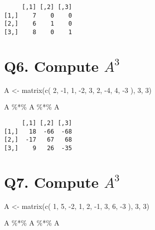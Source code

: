 \documentclass[
  letterpaper,
  DIV=11,
  numbers=noendperiod]{scrartcl}
\newenvironment{Shaded}{\begin{snugshade}}{\end{snugshade}}
\newcommand{\DecValTok}[1]{\textcolor[rgb]{0.68,0.00,0.00}{#1}}
\newcommand{\FunctionTok}[1]{\textcolor[rgb]{0.28,0.35,0.67}{#1}}
\newcommand{\NormalTok}[1]{\textcolor[rgb]{0.00,0.23,0.31}{#1}}
\newcommand{\OtherTok}[1]{\textcolor[rgb]{0.00,0.23,0.31}{#1}}
\newcommand{\SpecialCharTok}[1]{\textcolor[rgb]{0.37,0.37,0.37}{#1}}
\begin{document}
\begin{verbatim}
     [,1] [,2] [,3]
[1,]    7    0    0
[2,]    6    1    0
[3,]    8    0    1
\end{verbatim}

\hypertarget{q6.-compute-a3}{%
\section{\texorpdfstring{Q6. Compute
\(A^3\)}{Q6. Compute A\^{}3}}\label{q6.-compute-a3}}

\begin{Shaded}
\begin{Highlighting}[]
\NormalTok{A }\OtherTok{\textless{}{-}} \FunctionTok{matrix}\NormalTok{(}\FunctionTok{c}\NormalTok{(}
  \DecValTok{2}\NormalTok{, }\SpecialCharTok{{-}}\DecValTok{1}\NormalTok{, }\DecValTok{1}\NormalTok{,}
  \SpecialCharTok{{-}}\DecValTok{2}\NormalTok{, }\DecValTok{3}\NormalTok{, }\DecValTok{2}\NormalTok{,}
  \SpecialCharTok{{-}}\DecValTok{4}\NormalTok{, }\DecValTok{4}\NormalTok{, }\SpecialCharTok{{-}}\DecValTok{3}
\NormalTok{), }\DecValTok{3}\NormalTok{, }\DecValTok{3}\NormalTok{)}

\NormalTok{A }\SpecialCharTok{\%*\%}\NormalTok{ A }\SpecialCharTok{\%*\%}\NormalTok{ A}
\end{Highlighting}
\end{Shaded}

\begin{verbatim}
     [,1] [,2] [,3]
[1,]   18  -66  -68
[2,]  -17   67   68
[3,]    9   26  -35
\end{verbatim}

\hypertarget{q7.-compute-a3}{%
\section{\texorpdfstring{Q7. Compute
\(A^3\)}{Q7. Compute A\^{}3}}\label{q7.-compute-a3}}

\begin{Shaded}
\begin{Highlighting}[]
\NormalTok{A }\OtherTok{\textless{}{-}} \FunctionTok{matrix}\NormalTok{(}\FunctionTok{c}\NormalTok{(}
  \DecValTok{1}\NormalTok{, }\DecValTok{5}\NormalTok{, }\SpecialCharTok{{-}}\DecValTok{2}\NormalTok{,}
  \DecValTok{1}\NormalTok{, }\DecValTok{2}\NormalTok{, }\SpecialCharTok{{-}}\DecValTok{1}\NormalTok{,}
  \DecValTok{3}\NormalTok{, }\DecValTok{6}\NormalTok{, }\SpecialCharTok{{-}}\DecValTok{3}
\NormalTok{), }\DecValTok{3}\NormalTok{, }\DecValTok{3}\NormalTok{)}

\NormalTok{A }\SpecialCharTok{\%*\%}\NormalTok{ A }\SpecialCharTok{\%*\%}\NormalTok{ A}
\end{Highlighting}
\end{Shaded}
\end{document}

